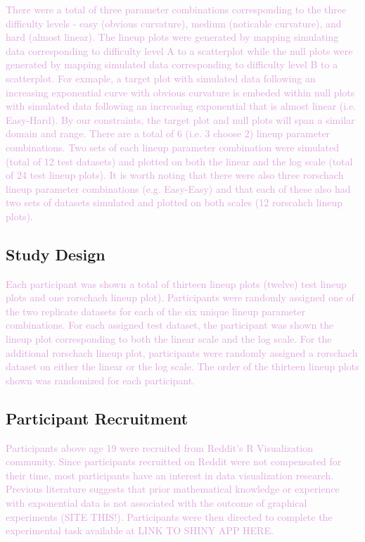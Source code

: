 \documentclass[]{interact}
\theoremstyle{plain}%
\theoremstyle{definition}
\theoremstyle{remark}
\begin{document}
\textcolor{Plum}{There were a total of three parameter combinations corresponding to the three difficulty levels - easy (obvious curvature), medium (noticable curvature), and hard (almost linear). 
The lineup plots were generated by mapping simulating data corresponding to difficulty level A to a scatterplot while the null plots were generated by mapping simulated data corresponding to difficulty level B to a scatterplot. 
For exmaple, a target plot with simulated data following an increasing exponential curve with obvious curvature is embeded within null plots with simulated data following an increasing exponential that is almost linear (i.e. Easy-Hard). 
By our constraints, the target plot and null plots will span a similar domain and range. 
There are a total of 6 (i.e. 3 choose 2) lineup parameter combinations.
Two sets of each lineup parameter combination were simulated (total of 12 test datasets) and plotted on both the linear and the log scale (total of 24 test lineup plots). 
It is worth noting that there were also three rorschach lineup parameter combinations (e.g. Easy-Easy) and that each of these also had two sets of datasets simulated and plotted on both scales (12 rorscahch lineup plots).
}

\hypertarget{study-design}{%
\subsection{Study Design}\label{study-design}}

\textcolor{Plum}{
Each participant was shown a total of thirteen lineup plots (twelve) test lineup plots and one rorschach lineup plot). Participants were randomly assigned one of the two replicate datasets for each of the six unique lineup parameter combinations. For each assigned test dataset, the participant was shown the lineup plot corresponding to both the linear scale and the log scale. For the additional rorschach lineup plot, participants were randomly assigned a rorschach dataset on either the linear or the log scale. The order of the thirteen lineup plots shown was randomized for each participant. 
}

\hypertarget{participant-recruitment}{%
\subsection{Participant Recruitment}\label{participant-recruitment}}

\textcolor{Plum}{Participants above age 19 were recruited from Reddit's R Visualization community. 
Since participants recruitted on Reddit were not compensated for their time, most participants have an interest in data visualization research. 
Previous literature suggests that prior mathematical knowledge or experience with exponential data is not associated with the outcome of graphical experiments (SITE THIS!). 
Participants were then directed to complete the experimental task available at LINK TO SHINY APP HERE.
}
\end{document}

